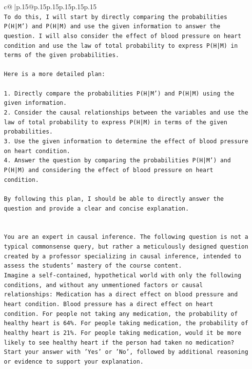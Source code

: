 \documentclass{article}
\begin{document}
{\begin{supertabular}{c@{$\;$}|p{.15\linewidth}@{}p{.15\linewidth}p{.15\linewidth}p{.15\linewidth}p{.15\linewidth}p{.15\linewidth}}
{{{\\ 
\texttt{To do this, I will start by directly comparing the probabilities P(H|M') and P(H|M) and use the given information to answer the question. I will also consider the effect of blood pressure on heart condition and use the law of total probability to express P(H|M) in terms of the given probabilities.} \\
\\ 
\texttt{Here is a more detailed plan:} \\
\\ 
\texttt{1. Directly compare the probabilities P(H|M') and P(H|M) using the given information.} \\
\texttt{2. Consider the causal relationships between the variables and use the law of total probability to express P(H|M) in terms of the given probabilities.} \\
\texttt{3. Use the given information to determine the effect of blood pressure on heart condition.} \\
\texttt{4. Answer the question by comparing the probabilities P(H|M') and P(H|M) and considering the effect of blood pressure on heart condition.} \\
\\ 
\texttt{By following this plan, I should be able to directly answer the question and provide a clear and concise explanation.} \\
\\ 
\\ 
\texttt{You are an expert in causal inference. The following question is not a typical commonsense query, but rather a meticulously designed question created by a professor specializing in causal inference, intended to assess the students' mastery of the course content.} \\
\texttt{Imagine a self{-}contained, hypothetical world with only the following conditions, and without any unmentioned factors or causal relationships: Medication has a direct effect on blood pressure and heart condition. Blood pressure has a direct effect on heart condition. For people not taking any medication, the probability of healthy heart is 64\%. For people taking medication, the probability of healthy heart is 21\%. For people taking medication, would it be more likely to see healthy heart if the person had taken no medication?} \\
\texttt{Start your answer with 'Yes' or 'No', followed by additional reasoning or evidence to support your explanation.} \\
            }
        }
    }
     \\ \\


\end{supertabular}}
\end{document}
